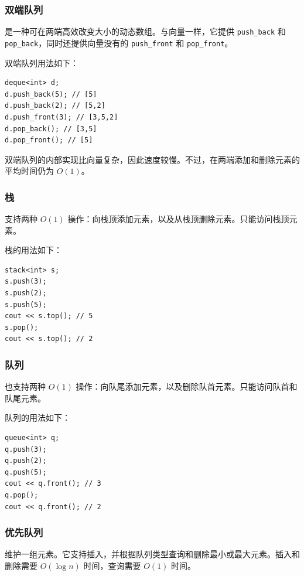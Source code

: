 \subsubsection{双端队列}


是一种可在两端高效改变大小的动态数组。与向量一样，它提供 \texttt{push\_back} 和 \texttt{pop\_back}，同时还提供向量没有的 \texttt{push\_front} 和 \texttt{pop\_front}。

双端队列用法如下：
\begin{lstlisting}
deque<int> d;
d.push_back(5); // [5]
d.push_back(2); // [5,2]
d.push_front(3); // [3,5,2]
d.pop_back(); // [3,5]
d.pop_front(); // [5]
\end{lstlisting}

双端队列的内部实现比向量复杂，因此速度较慢。不过，在两端添加和删除元素的平均时间仍为 $O(1)$。

\subsubsection{栈}


支持两种 $O(1)$ 操作：向栈顶添加元素，以及从栈顶删除元素。只能访问栈顶元素。

栈的用法如下：
\begin{lstlisting}
stack<int> s;
s.push(3);
s.push(2);
s.push(5);
cout << s.top(); // 5
s.pop();
cout << s.top(); // 2
\end{lstlisting}
\subsubsection{队列}


也支持两种 $O(1)$ 操作：向队尾添加元素，以及删除队首元素。只能访问队首和队尾元素。

队列的用法如下：
\begin{lstlisting}
queue<int> q;
q.push(3);
q.push(2);
q.push(5);
cout << q.front(); // 3
q.pop();
cout << q.front(); // 2
\end{lstlisting}

\subsubsection{优先队列}


维护一组元素。它支持插入，并根据队列类型查询和删除最小或最大元素。插入和删除需要 $O(\log n)$ 时间，查询需要 $O(1)$ 时间。

